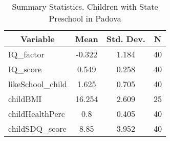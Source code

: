 
\begin{table}[htbp]\centering \caption{Summary Statistics. Children with State Preschool in Padova \label{bothChildmaternaStatPadova}}
\begin{tabular}{l c c  c}\hline\hline
\multicolumn{1}{c}{\textbf{Variable}} & \textbf{Mean}
 & \textbf{Std. Dev.} & \textbf{N}\\ \hline
IQ\_factor & -0.322 & 1.184  & 40\\
IQ\_score & 0.549 & 0.258  & 40\\
likeSchool\_child & 1.625 & 0.705  & 40\\
childBMI & 16.254 & 2.609  & 25\\
childHealthPerc & 0.8 & 0.405  & 40\\
childSDQ\_score & 8.85 & 3.952  & 40\\
\hline\end{tabular}
\end{table}
